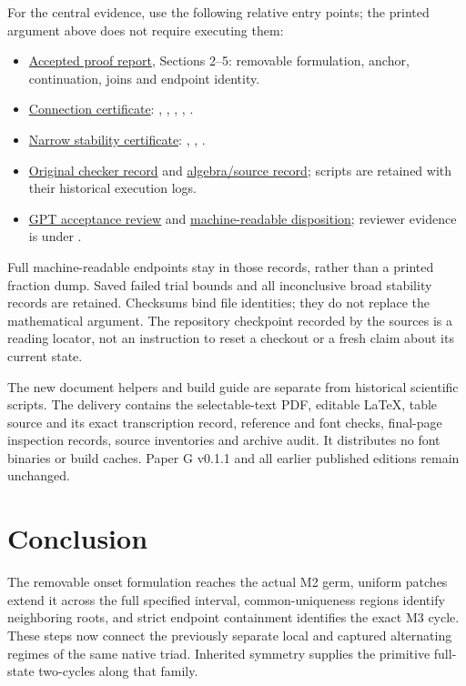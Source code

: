 \documentclass[11pt,a4paper]{article}
\numberwithin{equation}{section}
\begin{document}
For the central evidence, use the following relative entry points; the printed argument above does not require executing them:
\begin{itemize}
\item \href{evidence/branch/submitted/PROOF_REPORT.md}{Accepted proof report}, Sections 2--5: removable formulation, anchor, continuation, joins and endpoint identity.
\item \href{evidence/branch/submitted/data/CONNECTION_CERTIFICATE.json}{Connection certificate}: , , , , .
\item \href{evidence/branch/submitted/data/ENDPOINT_STABILITY_STRIP.json}{Narrow stability certificate}: , , .
\item \href{evidence/branch/submitted/data/CERTIFICATE_CHECK.json}{Original checker record} and \href{evidence/branch/submitted/data/ALGEBRA_AND_SOURCE_CHECKS.json}{algebra/source record}; scripts are retained with their historical execution logs.
\item \href{evidence/branch/NATIVE_ALTERNATING_BRANCH_CONNECTION_01_GPT_REVIEW.md}{GPT acceptance review} and \href{evidence/branch/GPT_ACCEPTANCE.json}{machine-readable disposition}; reviewer evidence is under .
\end{itemize}
Full machine-readable endpoints stay in those records, rather than a printed fraction dump. Saved failed trial bounds and all inconclusive broad stability records are retained. Checksums bind file identities; they do not replace the mathematical argument. The repository checkpoint recorded by the sources is a reading locator, not an instruction to reset a checkout or a fresh claim about its current state.

The new document helpers and build guide are separate from historical scientific scripts. The delivery contains the selectable-text PDF, editable LaTeX, table source and its exact transcription record, reference and font checks, final-page inspection records, source inventories and archive audit. It distributes no font binaries or build caches. Paper G v0.1.1 and all earlier published editions remain unchanged.

\section{Conclusion}\label{sec:conclusion}
The removable onset formulation reaches the actual M2 germ, uniform patches extend it across the full specified interval, common-uniqueness regions identify neighboring roots, and strict endpoint containment identifies the exact M3 cycle. These steps now connect the previously separate local and captured alternating regimes of the same native triad. Inherited symmetry supplies the primitive full-state two-cycles along that family.
\end{document}
